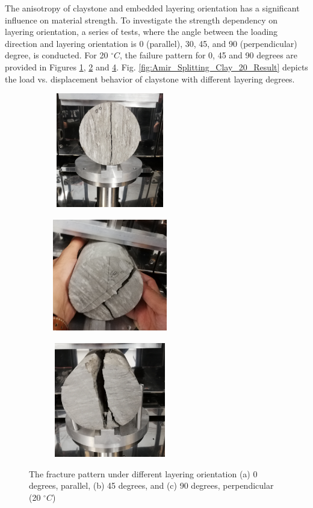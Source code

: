 The anisotropy of claystone and embedded layering orientation has a significant influence on material strength. To investigate the strength dependency on layering orientation, a series of tests, where the angle between the loading direction and layering orientation is 0 (parallel), 30, 45, and 90 (perpendicular) degree, is conducted. For 20 $^{\circ}C$, the failure pattern for 0, 45 and 90 degrees are provided in Figures \ref{fig:Amir_Splitting_Clay_0}, \ref{fig:Amir_Splitting_Clay_45} and \ref{fig:Amir_Splitting_Clay_90}. Fig. \ref{fig:Amir_Splitting_Clay_20_Result} depicts the load vs. displacement behavior of claystone with different layering degrees.

\begin{figure}[ht!]
\centering
\begin{subfigure}[c]{0.48\textwidth}
\centering
\includegraphics[width=5cm,height=5cm]{figures/Amir_Splitting_Clay_0.png}
\subcaption{}
\label{fig:Amir_Splitting_Clay_0}
\end{subfigure}
\hfill
\begin{subfigure}[c]{0.48\textwidth}
\centering
\includegraphics[width=5cm,height=5cm]{figures/Amir_Splitting_Clay_45.png}
\subcaption{}
\label{fig:Amir_Splitting_Clay_45}
\end{subfigure}
\hfill
\begin{subfigure}[c]{0.48\textwidth}
\centering
\includegraphics[width=5cm,height=5cm]{figures/Amir_Splitting_Clay_90.png}
\subcaption{}
\label{fig:Amir_Splitting_Clay_90}
\end{subfigure}
\caption{The fracture pattern under different layering orientation (a) 0 degrees, parallel, (b) 45 degrees, and (c) 90 degrees, perpendicular (20 $^{\circ}C$)}
\end{figure}

